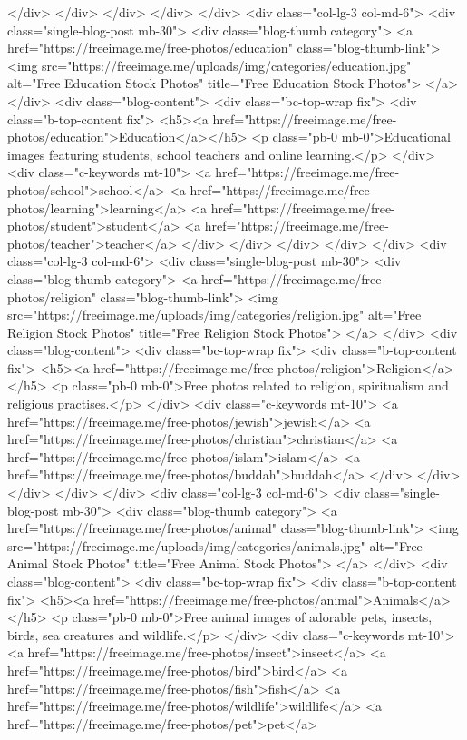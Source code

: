 </div>
</div>
</div>
</div>
</div>
<div class="col-lg-3 col-md-6">
<div class="single-blog-post mb-30">
<div class="blog-thumb category">
<a href="https://freeimage.me/free-photos/education" class="blog-thumb-link">
<img src="https://freeimage.me/uploads/img/categories/education.jpg" alt="Free Education Stock Photos" title="Free Education Stock Photos">
</a>
</div>
<div class="blog-content">
<div class="bc-top-wrap fix">
<div class="b-top-content fix">
<h5><a href="https://freeimage.me/free-photos/education">Education</a></h5>
<p class="pb-0 mb-0">Educational images featuring students, school teachers and online learning.</p>
</div>
<div class="c-keywords mt-10">
<a href="https://freeimage.me/free-photos/school">school</a> <a href="https://freeimage.me/free-photos/learning">learning</a> <a href="https://freeimage.me/free-photos/student">student</a> <a href="https://freeimage.me/free-photos/teacher">teacher</a>
</div>
</div>
</div>
</div>
</div>
<div class="col-lg-3 col-md-6">
<div class="single-blog-post mb-30">
<div class="blog-thumb category">
<a href="https://freeimage.me/free-photos/religion" class="blog-thumb-link">
<img src="https://freeimage.me/uploads/img/categories/religion.jpg" alt="Free Religion Stock Photos" title="Free Religion Stock Photos">
</a>
</div>
<div class="blog-content">
<div class="bc-top-wrap fix">
<div class="b-top-content fix">
<h5><a href="https://freeimage.me/free-photos/religion">Religion</a></h5>
<p class="pb-0 mb-0">Free photos related to religion, spiritualism and religious practises.</p>
</div>
<div class="c-keywords mt-10">
<a href="https://freeimage.me/free-photos/jewish">jewish</a> <a href="https://freeimage.me/free-photos/christian">christian</a> <a href="https://freeimage.me/free-photos/islam">islam</a> <a href="https://freeimage.me/free-photos/buddah">buddah</a>
</div>
</div>
</div>
</div>
</div>
<div class="col-lg-3 col-md-6">
<div class="single-blog-post mb-30">
<div class="blog-thumb category">
<a href="https://freeimage.me/free-photos/animal" class="blog-thumb-link">
<img src="https://freeimage.me/uploads/img/categories/animals.jpg" alt="Free Animal Stock Photos" title="Free Animal Stock Photos">
</a>
</div>
<div class="blog-content">
<div class="bc-top-wrap fix">
<div class="b-top-content fix">
<h5><a href="https://freeimage.me/free-photos/animal">Animals</a></h5>
<p class="pb-0 mb-0">Free animal images of adorable pets, insects, birds, sea creatures and wildlife.</p>
</div>
<div class="c-keywords mt-10">
<a href="https://freeimage.me/free-photos/insect">insect</a> <a href="https://freeimage.me/free-photos/bird">bird</a> <a href="https://freeimage.me/free-photos/fish">fish</a> <a href="https://freeimage.me/free-photos/wildlife">wildlife</a> <a href="https://freeimage.me/free-photos/pet">pet</a>
